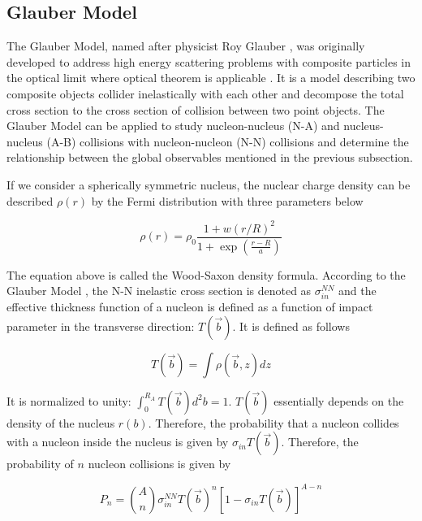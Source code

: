 \subsection{Glauber Model}

The Glauber Model, named after physicist Roy Glauber \cite{Glauber}, was originally developed to address high energy scattering problems with composite particles in the optical limit where optical theorem is applicable \cite{Optical1,Optical2}. It is a model describing two composite objects collider inelastically with each other and decompose the total cross section to the cross section of collision between two point objects. The Glauber Model can be applied to study nucleon-nucleus (N-A) and nucleus-nucleus (A-B) collisions with nucleon-nucleon (N-N) collisions and determine the relationship between the global observables mentioned in the previous subsection.    

If we consider a spherically symmetric nucleus, the nuclear charge density can be described $\rho(r)$ by the Fermi distribution with three parameters below

\begin{equation}
\rho(r) = \rho_0 \frac{1 + w(r/R)^2}{1 + \exp({\frac{r-R}{a}})}
\end{equation}

The equation above is called the Wood-Saxon density formula. According to the Glauber Model \cite{Glauber}, the N-N inelastic cross section is denoted as $\sigma_{in}^{NN}$ and the effective thickness function of a nucleon is defined as a function of impact parameter in the transverse direction: $T(\vec{b})$. It is defined as follows

\begin{equation}
T(\vec{b}) =  \int \rho(\vec{b},z) dz 
\end{equation}

It is normalized to unity: $\int^{R_A}_0 T(\vec{b}) d^2b = 1$. $T(\vec{b})$ essentially depends on the density of the nucleus $r(b)$. %
Therefore, the probability that a nucleon collides with a nucleon inside the nucleus is given by $\sigma_{in} T(\vec{b})$. Therefore, the probability of $n$ nucleon collisions is given by

\begin{equation}
P_n = {A \choose n} \sigma_{in}^{NN} T(\vec{b})^{n} [1 - \sigma_{in} T(\vec{b})]^{A-n}
\end{equation}

